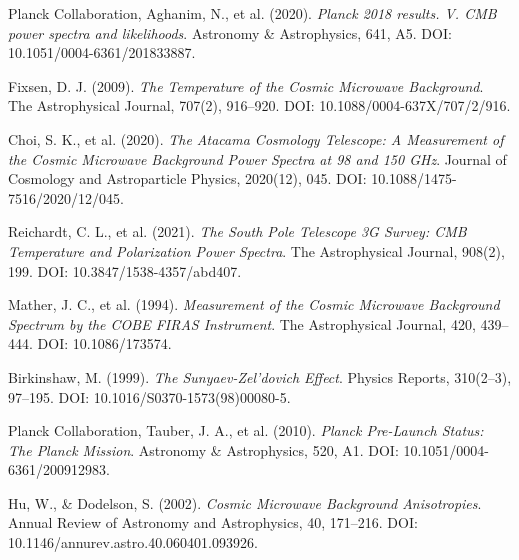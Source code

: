 \documentclass[12pt,a4paper]{article}
\begin{document}
	\begin{thebibliography}{9}
		Planck Collaboration, Aghanim, N., et al. (2020). 
		\textit{Planck 2018 results. V. CMB power spectra and likelihoods}. 
		Astronomy \& Astrophysics, 641, A5. 
		DOI: 10.1051/0004-6361/201833887.
		
		Fixsen, D. J. (2009). \textit{The Temperature of the Cosmic Microwave Background}. 
		The Astrophysical Journal, 707(2), 916–920. 
		DOI: 10.1088/0004-637X/707/2/916.
		
		Choi, S. K., et al. (2020).
		\textit{The Atacama Cosmology Telescope: A Measurement of the Cosmic Microwave Background Power Spectra at 98 and 150 GHz}.
		Journal of Cosmology and Astroparticle Physics, 2020(12), 045. 
		DOI: 10.1088/1475-7516/2020/12/045. 
		
		Reichardt, C. L., et al. (2021). \textit{The South Pole Telescope 3G Survey: CMB Temperature and Polarization Power Spectra}. 
		The Astrophysical Journal, 908(2), 199. 
		DOI: 10.3847/1538-4357/abd407.
		
		Mather, J. C., et al. (1994). \textit{Measurement of the Cosmic Microwave Background Spectrum by the COBE FIRAS Instrument}. 
		The Astrophysical Journal, 420, 439–444. 
		DOI: 10.1086/173574.
		
		Birkinshaw, M. (1999). \textit{The Sunyaev-Zel’dovich Effect}. 
		Physics Reports, 310(2–3), 97–195.
		DOI: 10.1016/S0370-1573(98)00080-5. 
		
		Planck Collaboration, Tauber, J. A., et al. (2010). \textit{Planck Pre-Launch Status: The Planck Mission}. 
		Astronomy \& Astrophysics, 520, A1. 
		DOI: 10.1051/0004-6361/200912983.
		
		Hu, W., \& Dodelson, S. (2002). \textit{Cosmic Microwave Background Anisotropies}. 
		Annual Review of Astronomy and Astrophysics, 40, 171–216. 
		DOI: 10.1146/annurev.astro.40.060401.093926. 
		
	\end{thebibliography}
	
\end{document}
